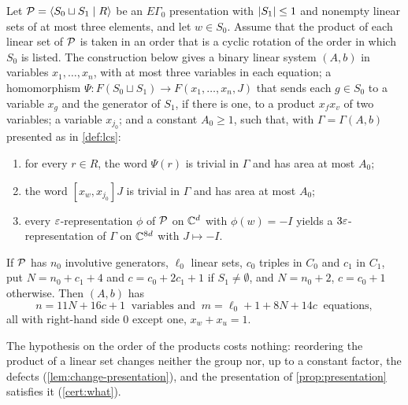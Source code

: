 \begin{lemma}\label{lem:gadget}
Let $\mathcal P=\langle S_0\sqcup S_1\mid R\rangle$ be an $E\Gamma_0$ presentation with $\lvert S_1\rvert\le1$ and nonempty linear sets of at most three
elements, and let $w\in S_0$. Assume that the product of each linear set of $\mathcal P$ is taken in an order that is a cyclic rotation of the order in
which $S_0$ is listed. The construction below gives a binary linear system $(A,b)$ in variables $x_1,\dots,x_n$, with at most three variables
in each equation; a homomorphism $\Psi:F(S_0\sqcup S_1)\to F(x_1,\dots,x_n,J)$ that sends each $g\in S_0$ to a variable $x_g$ and the
generator of $S_1$, if there is one, to a product $x_fx_v$ of two variables; a variable $x_{j_0}$; and a constant $A_0\ge1$, such that, with
$\Gamma=\Gamma(A,b)$ presented as in \cref{def:lcs}:
\begin{enumerate}[label=(G\arabic*),itemsep=1pt]
\item for every $r\in R$, the word $\Psi(r)$ is trivial in $\Gamma$ and has area at most $A_0$;
\item the word $[x_w,x_{j_0}]J$ is trivial in $\Gamma$ and has area at most $A_0$;
\item every $\varepsilon$-representation $\phi$ of $\mathcal P$ on $\mathbb C^d$ with $\phi(w)=-I$ yields a $3\varepsilon$-representation of $\Gamma$ on $\mathbb C^{8d}$
with $J\mapsto-I$.
\end{enumerate}
If $\mathcal P$ has $n_0$ involutive generators, $\ell_0$ linear sets, $c_0$ triples in $C_0$ and $c_1$ in $C_1$, put $N=n_0+c_1+4$ and
$c=c_0+2c_1+1$ if $S_1\ne\emptyset$, and $N=n_0+2$, $c=c_0+1$ otherwise. Then $(A,b)$ has
\[
n=11N+16c+1\ \text{ variables and }\ m=\ell_0+1+8N+14c\ \text{ equations},
\]
all with right-hand side $0$ except one, $x_w+x_u=1$.
\end{lemma}

The hypothesis on the order of the products costs nothing: reordering the product of a linear set changes neither the group nor, up to a
constant factor, the defects (\cref{lem:change-presentation}), and the presentation of \cref{prop:presentation} satisfies it
(\cref{cert:what}).

